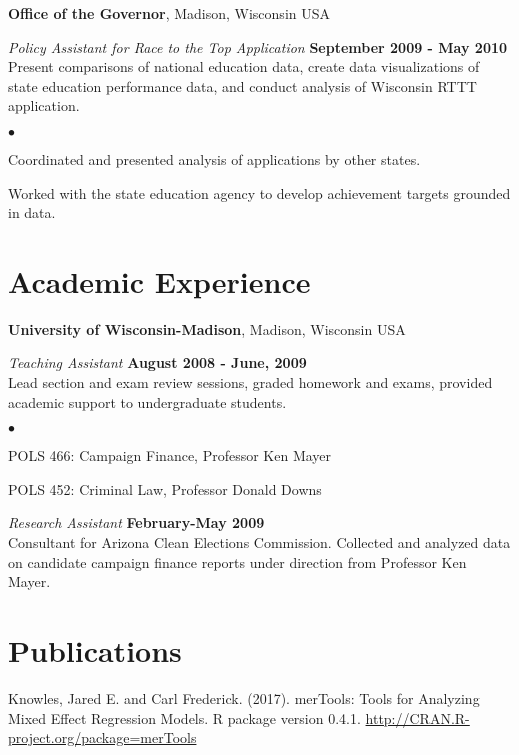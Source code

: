 \documentclass[margin,line]{res}
\newenvironment{list2}{
  \begin{list}{$\bullet$}{%
      \setlength{\itemsep}{0in}
      \setlength{\parsep}{0in} \setlength{\parskip}{0in}
      \setlength{\topsep}{0in} \setlength{\partopsep}{0in} 
      \setlength{\leftmargin}{0.2in}}}{\end{list}}
\begin{document}
\begin{resume}
{\bf Office of the Governor}, Madison, Wisconsin USA

{\em Policy Assistant for Race to the Top Application} \hfill {\bf September 2009 - May 2010}\\
Present comparisons of national education data, create data visualizations of state education performance data, and conduct analysis of Wisconsin RTTT application. 
\begin{list2}
\item Coordinated and presented analysis of applications by other states.
\item Worked with the state education agency to develop achievement targets grounded in data.
\end{list2}

\section{\sc Academic Experience}
{\bf University of Wisconsin-Madison}, Madison, Wisconsin USA

\vspace{-.1cm}
{\em Teaching Assistant} \hfill {\bf August 2008 - June, 2009}\\
Lead section and exam review sessions, graded homework and exams, provided academic support to undergraduate students.
\vspace*{.05in}  
\begin{list2}
\item POLS 466: Campaign Finance, Professor Ken Mayer
\item POLS 452: Criminal Law, Professor Donald Downs
\end{list2}


{\em Research Assistant} \hfill {\bf February-May 2009}\\
Consultant for Arizona Clean Elections Commission. Collected and analyzed data on candidate campaign finance reports under direction from Professor Ken Mayer. 
\vspace*{.05in}  

\vspace*{5mm}

\section{\sc Publications}

Knowles, Jared E. and Carl Frederick. (2017). merTools: Tools for Analyzing Mixed 
Effect Regression Models. R package version 0.4.1. 
\url{http://CRAN.R-project.org/package=merTools}


\end{resume}
\end{document}
